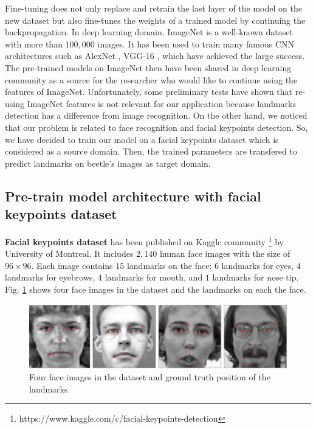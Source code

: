 \documentclass[review]{elsarticle}
\begin{document}
Fine-tuning does not only replace and retrain the last layer of the model on
the new dataset but also fine-tunes the weights of a trained
model by continuing the backpropagation. In deep learning domain, ImageNet \cite{imagenet_cvpr09} is a well-known dataset with more than $100,000 $ images. It has been used to train many famous CNN architectures such as AlexNet \cite{krizhevsky2012imagenet}, VGG-16 \cite{simonyan2014very}, which have achieved the large success. The pre-trained models on ImageNet then have been shared in deep learning community as a source for the researcher who would like to continue using the features of ImageNet. Unfortunately, some preliminary tests have shown that re-using ImageNet features
is not relevant for our application because landmarks detection has a difference from image recognition. On the other hand, we noticed that our problem is related to face recognition and facial keypoints detection. So, we have decided to train our model on a facial keypoints dataset which is considered as a source domain. Then, the trained parameters are transfered to predict landmarks on beetle's images as target domain.


\subsection{Pre-train model architecture with facial keypoints dataset}
\textbf{Facial keypoints dataset} has been published on Kaggle community \footnote{https://www.kaggle.com/c/facial-keypoints-detection} by University of Montreal. It includes $2,140$ human face images with the size of $96 \times 96$. Each image contains $15$ landmarks on the face: $6$ landmarks for eyes, $4$ landmarks for eyebrows, $4$ landmarks for mouth, and $1$ landmarks for nose tip. Fig. \ref{figaface} shows four face images in the dataset and the landmarks on each the face.

\begin{figure}[htbp]
	\centerline{\includegraphics[scale=0.16]{images/face_dataset_2.png}}
	\caption{Four face images in the dataset and ground truth position of the landmarks.}
	\label{figaface}
\end{figure}
\end{document}
